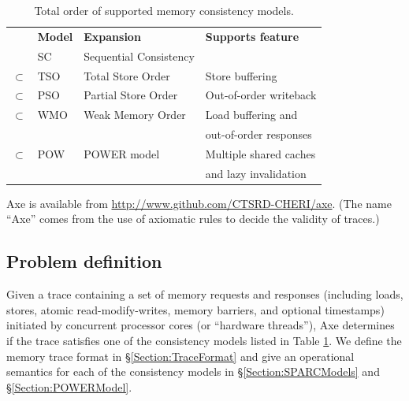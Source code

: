 \documentclass[11pt]{article}
\begin{document}
\begin{table}
\renewcommand{\arraystretch}{1.5}
\begin{center}
\begin{tabular}{llll}
          & \textbf{Model}  & \textbf{Expansion} & \textbf{Supports feature} \\
          & SC     & Sequential Consistency \cite{SC} \\
$\subset$ & TSO    & Total Store Order \cite{SPARC} & Store buffering \\
$\subset$ & PSO    & Partial Store Order \cite{SPARC} & Out-of-order writeback \\
$\subset$ & WMO\footnotemark[2]
                   & Weak Memory Order \cite{SPARC} & Load buffering and \\
          &        & & out-of-order responses \\
$\subset$ & POW    & POWER model \cite{POWER} & Multiple shared caches \\
          &        & & and lazy invalidation
\end{tabular}
\end{center}
\caption{Total order of supported memory consistency models.}
\label{Table:Models}
\end{table}


Axe is available from \url{http://www.github.com/CTSRD-CHERI/axe}.
(The name ``Axe'' comes from the use of axiomatic rules to decide the
validity of traces.)

\subsection{Problem definition}
\label{Section:ProbDef}

Given a trace containing a set of memory requests and responses
(including loads, stores, atomic read-modify-writes, memory barriers,
and optional timestamps) initiated by concurrent processor cores (or
``hardware threads''), Axe determines if the trace satisfies one of
the consistency models listed in Table \ref{Table:Models}.  We define
the memory trace format in \S\ref{Section:TraceFormat} and give an
operational semantics for each of the consistency models in
\S\ref{Section:SPARCModels} and \S\ref{Section:POWERModel}.
\end{document}
